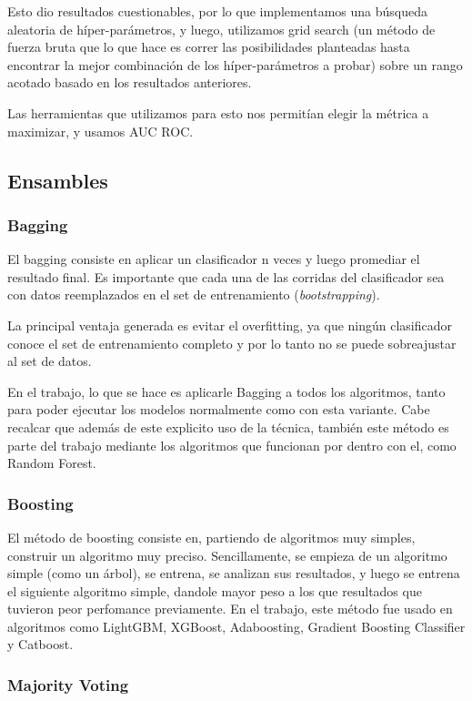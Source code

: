 \documentclass[a4paper]{article}
\begin{document}
Esto dio resultados cuestionables, por lo que implementamos una búsqueda aleatoria de híper-parámetros, y luego, utilizamos grid search (un método de fuerza bruta que lo que hace es correr las posibilidades planteadas hasta encontrar la mejor combinación de los híper-parámetros a probar) sobre un rango acotado basado en los resultados anteriores.

Las herramientas que utilizamos para esto nos permitían elegir la métrica a maximizar, y usamos AUC ROC.

\subsection{Ensambles}

\subsubsection{Bagging}

El bagging consiste en aplicar un clasificador n veces y luego promediar el resultado final. Es importante que cada una de las corridas del clasificador sea con datos reemplazados en el set de entrenamiento (\textit{bootstrapping}).

La principal ventaja generada es evitar el overfitting, ya que ningún clasificador conoce el set de entrenamiento completo y por lo tanto no se puede sobreajustar al set de datos.

En el trabajo, lo que se hace es aplicarle Bagging a todos los algoritmos, tanto para poder ejecutar los modelos normalmente como con esta variante. Cabe recalcar que además de este explicito uso de la técnica, también este método es parte del trabajo mediante los algoritmos que funcionan por dentro con el, como Random Forest.

\subsubsection{Boosting}

El método de boosting consiste en, partiendo de algoritmos muy simples, construir un algoritmo muy preciso. Sencillamente, se empieza de un algoritmo simple (como un árbol), se entrena, se analizan sus resultados, y luego se entrena el siguiente algoritmo simple, dandole mayor peso a los que resultados que tuvieron peor perfomance previamente. En el trabajo, este método fue usado en algoritmos como LightGBM, XGBoost, Adaboosting, Gradient Boosting Classifier y Catboost.

\subsubsection{Majority Voting}
\end{document}
